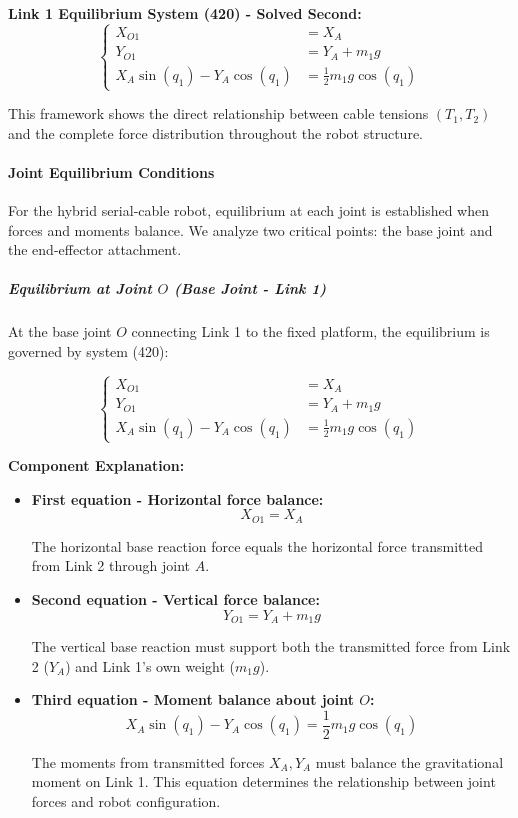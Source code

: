\textbf{Link 1 Equilibrium System (420) - Solved Second:}
\begin{equation}
\left\{
\begin{aligned}
X_{O1} &= X_A \\
Y_{O1} &= Y_A + m_1 g \\
X_A \sin(q_1) - Y_A \cos(q_1) &= \frac{1}{2}m_1 g \cos(q_1)
\end{aligned}
\right.
\tag{420}
\end{equation}

This framework shows the direct relationship between cable tensions $(T_1, T_2)$ and the complete force distribution throughout the robot structure.

\paragraph{Joint Equilibrium Conditions}

For the hybrid serial-cable robot, equilibrium at each joint is established when forces and moments balance. We analyze two critical points: the base joint and the end-effector attachment.

\subparagraph{Equilibrium at Joint $O$ (Base Joint - Link 1)}

At the base joint $O$ connecting Link 1 to the fixed platform, the equilibrium is governed by system (420):

\begin{equation}
\left\{
\begin{aligned}
X_{O1} &= X_A \\
Y_{O1} &= Y_A + m_1 g \\
X_A \sin(q_1) - Y_A \cos(q_1) &= \frac{1}{2}m_1 g \cos(q_1)
\end{aligned}
\right.
\tag{420}
\end{equation}

\textbf{Component Explanation:}

\begin{itemize}
    \item \textbf{First equation - Horizontal force balance:}
    $$X_{O1} = X_A$$
    
    The horizontal base reaction force equals the horizontal force transmitted from Link 2 through joint $A$.
    
    \item \textbf{Second equation - Vertical force balance:}
    $$Y_{O1} = Y_A + m_1 g$$
    
    The vertical base reaction must support both the transmitted force from Link 2 ($Y_A$) and Link 1's own weight ($m_1 g$).
    
    \item \textbf{Third equation - Moment balance about joint $O$:}
    $$X_A \sin(q_1) - Y_A \cos(q_1) = \frac{1}{2}m_1 g \cos(q_1)$$
    
    The moments from transmitted forces $X_A, Y_A$ must balance the gravitational moment on Link 1. This equation determines the relationship between joint forces and robot configuration.
\end{itemize}

